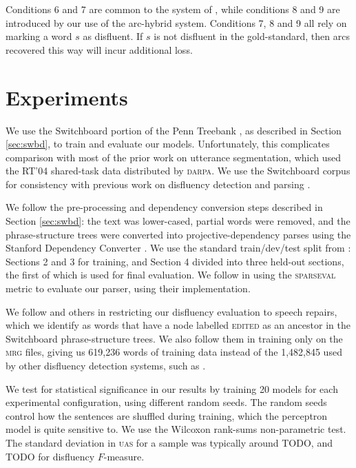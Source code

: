 \documentclass[11pt,letterpaper]{article}
\newcommand{\sparseval}{\textsc{sparseval}\xspace}
\begin{document}
Conditions 6 and 7 are common to the system of \citet{honnibal:14}, while
conditions 8 and 9 are introduced by our use of the arc-hybrid system.  Conditions
7, 8 and 9 all rely on marking a word $s$ as disfluent.  If $s$ is not disfluent
in the gold-standard, then arcs recovered this way will incur additional loss.
\newpage

\section{Experiments}

We use the Switchboard portion of the Penn Treebank \citep{marcus:93}, as
described in Section \ref{sec:swbd}, to train and evaluate our models.  Unfortunately,
this complicates comparison with most of the prior work on utterance segmentation,
which used the RT'04 shared-task data distributed by \textsc{darpa}.  We use
the Switchboard corpus for consistency with previous work on disfluency 
detection and parsing \citep{rasooli:13,honnibal:14,qian:13}.

We follow the pre-processing and dependency conversion steps described in
Section \ref{sec:swbd}: the text was lower-cased, partial words were removed,
and the phrase-structure trees were converted into projective-dependency parses
using the Stanford Dependency Converter \citep{stanford_deps}.
We use the standard train/dev/test split from \citet{Charniak01a}: Sections 2
and 3 for training, and Section 4 divided into three held-out sections, the first
of which is used for final evaluation.
We follow \citet{honnibal:14} in using the \sparseval \citep{sparseval}
metric to evaluate our parser, using their implementation.

We follow \citet{Johnson04a} and others in restricting our disfluency evaluation
to speech repairs, which we identify as words that have a node labelled \textsc{edited}
as an ancestor in the Switchboard phrase-structure trees.  We also follow them
in training only on the \textsc{mrg} files, giving us 619,236 words of training
data instead of the 1,482,845 used by other disfluency detection systems, such
as \citet{qian:13}.

We test for statistical significance in our results by training 20 models for
each experimental configuration, using different random seeds. The random seeds
control how the sentences are shuffled during training, which the perceptron
model is quite sensitive to.  We use the Wilcoxon rank-sums non-parametric test.
The standard deviation in \textsc{uas} for a sample was typically around TODO,
and TODO for disfluency $F$-measure.
\end{document}
